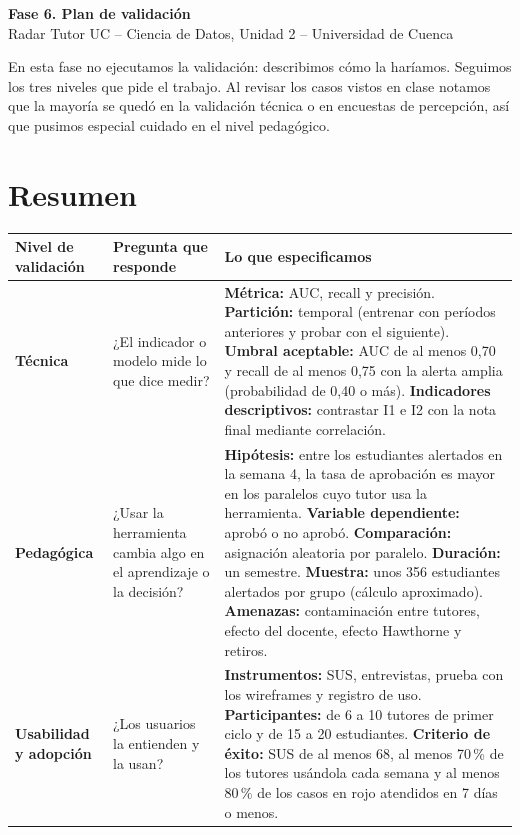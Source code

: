 \documentclass[11pt]{article}
\begin{document}
\begin{center}
{\Large\bfseries Fase 6. Plan de validación}\\[2pt]
Radar Tutor UC -- Ciencia de Datos, Unidad 2 -- Universidad de Cuenca
\end{center}

En esta fase no ejecutamos la validación: describimos cómo la haríamos. Seguimos los tres niveles que pide el trabajo. Al revisar los casos vistos en clase notamos que la mayoría se quedó en la validación técnica o en encuestas de percepción, así que pusimos especial cuidado en el nivel pedagógico.

\section*{Resumen}

{\small
\begin{longtable}{P{2.2cm} P{3.2cm} P{9.8cm}}
\toprule
\textbf{Nivel de validación} & \textbf{Pregunta que responde} & \textbf{Lo que especificamos}\\
\midrule
\endhead
\bottomrule
\endfoot
\textbf{Técnica} & ¿El indicador o modelo mide lo que dice medir? & \textbf{Métrica:} AUC, recall y precisión. \textbf{Partición:} temporal (entrenar con períodos anteriores y probar con el siguiente). \textbf{Umbral aceptable:} AUC de al menos 0,70 y recall de al menos 0,75 con la alerta amplia (probabilidad de 0,40 o más). \textbf{Indicadores descriptivos:} contrastar I1 e I2 con la nota final mediante correlación.\\
\midrule
\textbf{Pedagógica} & ¿Usar la herramienta cambia algo en el aprendizaje o la decisión? & \textbf{Hipótesis:} entre los estudiantes alertados en la semana 4, la tasa de aprobación es mayor en los paralelos cuyo tutor usa la herramienta. \textbf{Variable dependiente:} aprobó o no aprobó. \textbf{Comparación:} asignación aleatoria por paralelo. \textbf{Duración:} un semestre. \textbf{Muestra:} unos 356 estudiantes alertados por grupo (cálculo aproximado). \textbf{Amenazas:} contaminación entre tutores, efecto del docente, efecto Hawthorne y retiros.\\
\midrule
\textbf{Usabilidad y adopción} & ¿Los usuarios la entienden y la usan? & \textbf{Instrumentos:} SUS, entrevistas, prueba con los wireframes y registro de uso. \textbf{Participantes:} de 6 a 10 tutores de primer ciclo y de 15 a 20 estudiantes. \textbf{Criterio de éxito:} SUS de al menos 68, al menos 70\,\% de los tutores usándola cada semana y al menos 80\,\% de los casos en rojo atendidos en 7 días o menos.\\
\end{longtable}
}
\end{document}

